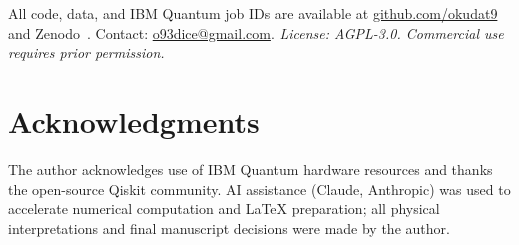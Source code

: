 \documentclass[10pt,twocolumn]{article}
\begin{document}
All code, data, and IBM Quantum job IDs are available at
\href{https://github.com/okudat9}{github.com/okudat9} and
Zenodo~\cite{EEDTv8}.
Contact: \href{mailto:o93dice@gmail.com}{o93dice@gmail.com}.
\emph{License: AGPL-3.0. Commercial use requires prior permission.}


\section*{Acknowledgments}

The author acknowledges use of IBM Quantum hardware resources and
thanks the open-source Qiskit community.
AI assistance (Claude, Anthropic) was used to accelerate numerical
computation and LaTeX preparation; all physical interpretations and
final manuscript decisions were made by the author.
\end{document}
